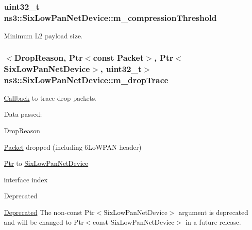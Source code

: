 \subsubsection[{\texorpdfstring{m\+\_\+compression\+Threshold}{m_compressionThreshold}}]{\setlength{\rightskip}{0pt plus 5cm}uint32\+\_\+t ns3\+::\+Six\+Low\+Pan\+Net\+Device\+::m\+\_\+compression\+Threshold\hspace{0.3cm}{\ttfamily [private]}}\hypertarget{classns3_1_1SixLowPanNetDevice_a61c90503b8ea0015e2c3e4dc1f599582}{}\label{classns3_1_1SixLowPanNetDevice_a61c90503b8ea0015e2c3e4dc1f599582}


Minimum L2 payload size. 

\subsubsection[{\texorpdfstring{m\+\_\+drop\+Trace}{m_dropTrace}}]{$<${\bf Drop\+Reason}, {\bf Ptr}$<$const {\bf Packet}$>$, {\bf Ptr}$<${\bf Six\+Low\+Pan\+Net\+Device}$>$, uint32\+\_\+t$>$ ns3\+::\+Six\+Low\+Pan\+Net\+Device\+::m\+\_\+drop\+Trace\hspace{0.3cm}{\ttfamily [private]}}\hypertarget{classns3_1_1SixLowPanNetDevice_a93e0ef7a17057bcb8420b8d37ec56356}{}\label{classns3_1_1SixLowPanNetDevice_a93e0ef7a17057bcb8420b8d37ec56356}


\hyperlink{classns3_1_1Callback}{Callback} to trace drop packets. 

Data passed\+: \begin{DoxyItemize}
\item Drop\+Reason \item \hyperlink{classns3_1_1Packet}{Packet} dropped (including 6\+Lo\+W\+P\+AN header) \item \hyperlink{classns3_1_1Ptr}{Ptr} to \hyperlink{classns3_1_1SixLowPanNetDevice}{Six\+Low\+Pan\+Net\+Device} \item interface index \begin{DoxyRefDesc}{Deprecated}
\item[\hyperlink{deprecated__deprecated000030}{Deprecated}]The non-\/const {\ttfamily Ptr$<$\+Six\+Low\+Pan\+Net\+Device$>$} argument is deprecated and will be changed to {\ttfamily Ptr$<$const Six\+Low\+Pan\+Net\+Device$>$} in a future release. \end{DoxyRefDesc}
\end{DoxyItemize}
